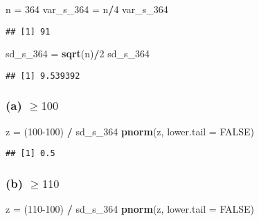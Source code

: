 \documentclass[]{article}
\newenvironment{Shaded}{\begin{snugshade}}{\end{snugshade}}
\newcommand{\DataTypeTok}[1]{\textcolor[rgb]{0.13,0.29,0.53}{#1}}
\newcommand{\DecValTok}[1]{\textcolor[rgb]{0.00,0.00,0.81}{#1}}
\newcommand{\KeywordTok}[1]{\textcolor[rgb]{0.13,0.29,0.53}{\textbf{#1}}}
\newcommand{\NormalTok}[1]{#1}
\newcommand{\OperatorTok}[1]{\textcolor[rgb]{0.81,0.36,0.00}{\textbf{#1}}}
\newcommand{\OtherTok}[1]{\textcolor[rgb]{0.56,0.35,0.01}{#1}}
\newcommand{\StringTok}[1]{\textcolor[rgb]{0.31,0.60,0.02}{#1}}
\begin{document}
\begin{Shaded}
\begin{Highlighting}[]
\NormalTok{n =}\StringTok{ }\DecValTok{364}
\NormalTok{var_s_}\DecValTok{364}\NormalTok{ =}\StringTok{ }\NormalTok{n}\OperatorTok{/}\DecValTok{4}
\NormalTok{var_s_}\DecValTok{364}
\end{Highlighting}
\end{Shaded}

\begin{verbatim}
## [1] 91
\end{verbatim}

\begin{Shaded}
\begin{Highlighting}[]
\NormalTok{sd_s_}\DecValTok{364}\NormalTok{ =}\StringTok{ }\KeywordTok{sqrt}\NormalTok{(n)}\OperatorTok{/}\DecValTok{2}
\NormalTok{sd_s_}\DecValTok{364}
\end{Highlighting}
\end{Shaded}

\begin{verbatim}
## [1] 9.539392
\end{verbatim}

\hypertarget{a-ge-100}{%
\subsubsection{\texorpdfstring{(a)
\(\ge 100\)}{(a) \textbackslash ge 100}}\label{a-ge-100}}

\begin{Shaded}
\begin{Highlighting}[]
\NormalTok{z =}\StringTok{ }\NormalTok{(}\DecValTok{100-100}\NormalTok{) }\OperatorTok{/}\StringTok{ }\NormalTok{sd_s_}\DecValTok{364}
\KeywordTok{pnorm}\NormalTok{(z, }\DataTypeTok{lower.tail =} \OtherTok{FALSE}\NormalTok{)}
\end{Highlighting}
\end{Shaded}

\begin{verbatim}
## [1] 0.5
\end{verbatim}

\hypertarget{b-ge-110}{%
\subsubsection{\texorpdfstring{(b)
\(\ge 110\)}{(b) \textbackslash ge 110}}\label{b-ge-110}}

\begin{Shaded}
\begin{Highlighting}[]
\NormalTok{z =}\StringTok{ }\NormalTok{(}\DecValTok{110-100}\NormalTok{) }\OperatorTok{/}\StringTok{ }\NormalTok{sd_s_}\DecValTok{364}
\KeywordTok{pnorm}\NormalTok{(z, }\DataTypeTok{lower.tail =} \OtherTok{FALSE}\NormalTok{)}
\end{Highlighting}
\end{Shaded}
\end{document}
